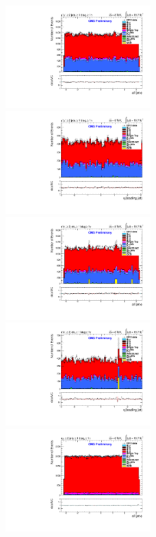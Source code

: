 \documentclass[oneside, a4paper, 11pt, ]{report}
\begin{document}
\begin{figure}
\includegraphics[width=0.5\textwidth]{Plots/ControlPlots/TTbarDiLeptonAnalysis/MuMu/Jets/all_jet_phi_splitTTbar_ratio.pdf}
\includegraphics[width=0.5\textwidth]{Plots/ControlPlots/TTbarDiLeptonAnalysis/MuMu/Jets/jet1_phi_splitTTbar_ratio.pdf}\\
\includegraphics[width=0.5\textwidth]{Plots/ControlPlots/TTbarDiLeptonAnalysis/EE/Jets/all_jet_phi_splitTTbar_ratio.pdf}
\includegraphics[width=0.5\textwidth]{Plots/ControlPlots/TTbarDiLeptonAnalysis/EE/Jets/jet1_phi_splitTTbar_ratio.pdf} \\
\includegraphics[width=0.5\textwidth]{Plots/ControlPlots/TTbarDiLeptonAnalysis/EMu/Jets/all_jet_phi_splitTTbar_ratio.pdf}

\end{figure}
\end{document}
